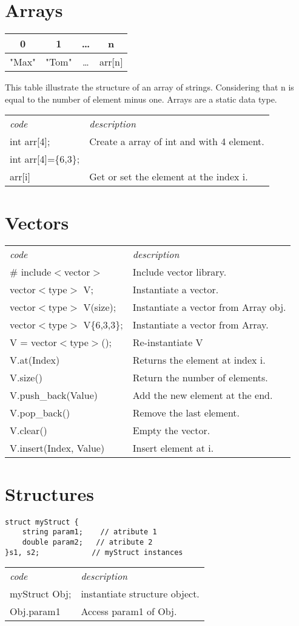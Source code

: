 \documentclass[5pt]{article}
\begin{document}
\begin{multicols}{2}
\section{Arrays}
\begin{tabular}{c|c|c|c }
 0 & 1 & … & n \\ 
 \hline
 "Max" & "Tom" & … & arr$[$n$]$
\end{tabular}
This table illustrate the structure of an array of strings. Considering that n is equal to the number of element minus one. Arrays are a static data type.\\[6pt]
\begin{tabular}{ll}
\emph{code} & \emph{description}\\
int arr[4]; & Create a array of int and with 4 element.\\
int arr[4]=\{6,3\}; & \\
arr$[$i$]$ & Get or set the element at the index i.\\
\end{tabular}


\section{Vectors}
\begin{tabular}{ll}
\emph{code} & \emph{description}\\
\# include$<$vector$>$ & Include vector library.\\
vector$<$type$>$ V; & Instantiate a vector.\\
vector$<$type$>$ V(size); & Instantiate a vector from Array obj.\\
vector$<$type$>$ V\{6,3,3\}; & Instantiate a vector from Array.\\
V = vector$<$type$>$(); & Re-instantiate V\\
V.at(Index) & Returns the element at index i.\\
V.size() & Return the number of elements.\\
V.push\_back(Value)  & Add the new element at the end.\\
V.pop\_back() & Remove the last element.\\
V.clear() & Empty the vector.\\
V.insert(Index, Value) & Insert element at i.
\end{tabular}


\section{Structures}
\begin{verbatim}
struct myStruct {
    string param1;    // atribute 1
    double param2;   // atribute 2
}s1, s2;            // myStruct instances
\end{verbatim}
\begin{tabular}{ll}
\emph{code} & \emph{description}\\
myStruct Obj; & instantiate structure object.\\
Obj.param1 & Access param1 of Obj.\\
\end{tabular}



\end{multicols}
\end{document}

